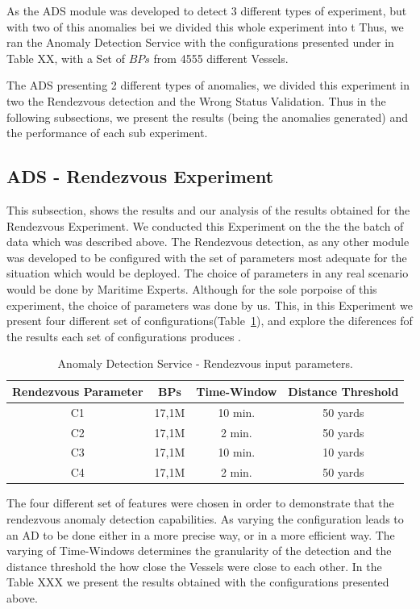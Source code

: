 As the ADS module was developed to detect 3 different types of experiment, but with two of this anomalies bei we divided this whole experiment into t
Thus, we ran the Anomaly Detection Service with the configurations presented under in Table XX, with a Set of   $BPs$ from 4555 different Vessels. 

The ADS presenting 2 different types of anomalies, we divided this experiment in two the Rendezvous detection and the Wrong Status Validation. Thus in the following subsections, we present the results (being the anomalies generated) and the performance of each sub experiment.


\subsection{ADS - Rendezvous Experiment}
\label{subsection: ADS - Rendezvous Experiment}
This subsection, shows the results and our analysis of the results obtained for the Rendezvous Experiment.
We conducted this Experiment on the the the batch of data which was described above. The Rendezvous detection, as any other module was developed to be configured with the set of parameters most adequate for the situation which would be deployed. The choice of parameters in any real scenario would be done by Maritime Experts. Although for the sole porpoise of this experiment, the choice of parameters was done by us. This, in this Experiment we present four different set of configurations(Table~\ref{Table: 5 ADS Rendezvous input paramenters}), and explore the diferences fof the results each set of configurations produces .

\begin{table}[H]
\centering
\caption{Anomaly Detection Service - Rendezvous input parameters.}
\label{Table: 5 ADS Rendezvous input paramenters}
\begin{tabular}{@{}cccc@{}}
\toprule
Rendezvous Parameter & BPs & Time-Window & Distance Threshold \\ \midrule
C1 & 17,1M & 10 min. & 50 yards \\
C2 & 17,1M & 2 min. & 50 yards \\
C3 & 17,1M & 10 min. & 10 yards \\
C4 & 17,1M & 2 min. & 50 yards \\ \bottomrule
\end{tabular}
\end{table}

The four different set of features were chosen in order to demonstrate that the rendezvous anomaly detection capabilities. As varying the configuration leads to an AD to be done either in a more precise way, or in a more efficient way. The varying of Time-Windows determines the granularity of the detection and the distance threshold the how close the Vessels were close to each other. In the Table XXX we present the results obtained with the configurations presented above.


